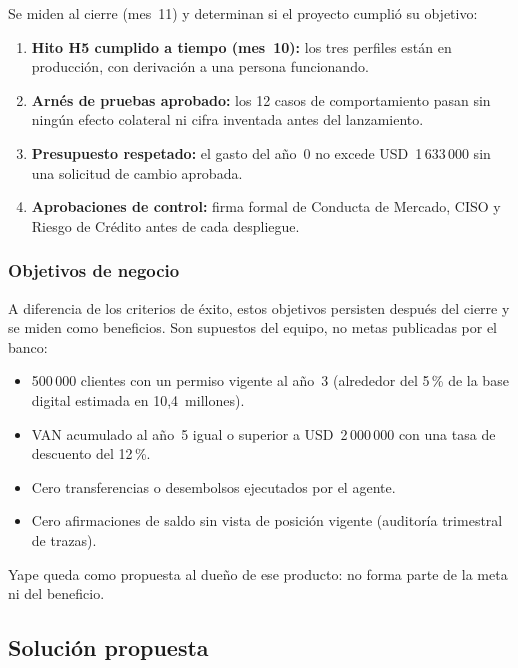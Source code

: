 \documentclass[11pt,a4paper]{article}
\newcommand{\usd}[1]{USD~#1}
\begin{document}
Se miden al cierre (mes~11) y determinan si el proyecto cumplió su objetivo:

\begin{enumerate}
  \item \textbf{Hito H5 cumplido a tiempo (mes~10):} los tres perfiles están en producción, con derivación a una persona funcionando.
  \item \textbf{Arnés de pruebas aprobado:} los 12 casos de comportamiento pasan sin ningún efecto colateral ni cifra inventada antes del lanzamiento.
  \item \textbf{Presupuesto respetado:} el gasto del año~0 no excede \usd{1\,633\,000} sin una solicitud de cambio aprobada.
  \item \textbf{Aprobaciones de control:} firma formal de Conducta de Mercado, CISO y Riesgo de Crédito antes de cada despliegue.
\end{enumerate}

\subsubsection{Objetivos de negocio}

A diferencia de los criterios de éxito, estos objetivos persisten después del cierre y se miden como beneficios. Son supuestos del equipo, no metas publicadas por el banco:

\begin{itemize}
  \item 500\,000 clientes con un permiso vigente al año~3 (alrededor del 5\,\% de la base digital estimada en 10,4~millones).
  \item VAN acumulado al año~5 igual o superior a \usd{2\,000\,000} con una tasa de descuento del 12\,\%.
  \item Cero transferencias o desembolsos ejecutados por el agente.
  \item Cero afirmaciones de saldo sin vista de posición vigente (auditoría trimestral de trazas).
\end{itemize}

Yape queda como propuesta al dueño de ese producto: no forma parte de la meta ni del beneficio.

\subsection{Solución propuesta}\label{sec:solucion}
\end{document}
